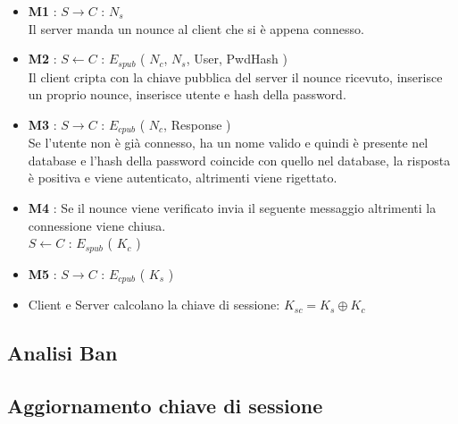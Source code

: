 \documentclass[a4paper,titlepage]{article}
\begin{document}
\begin{itemize}
\item \textbf{M1} : $S \rightarrow C$ : $N_s$ \\
Il server manda un nounce al client che si è appena connesso.
\item \textbf{M2} : $S \leftarrow C$ : $E_{spub}$ ( $N_c$, $N_s$, User, PwdHash )\\
Il client cripta con la chiave pubblica del server il nounce ricevuto, inserisce un proprio nounce, inserisce utente e hash della password.
\item \textbf{M3} : $S \rightarrow C$ : $E_{cpub}$ ( $N_c$, Response )\\
Se l'utente non è già connesso, ha un nome valido e quindi è presente nel database e l'hash della password coincide con quello nel database, la risposta è positiva e viene autenticato, altrimenti viene rigettato.
\item \textbf{M4} : Se il nounce viene verificato invia il seguente messaggio altrimenti la connessione viene chiusa.\\
$S \leftarrow C$ : $E_{spub}$ ( $K_c$ )
\item \textbf{M5} : $S \rightarrow C$ : $E_{cpub}$ ( $K_s$ )
\item Client e Server calcolano la chiave di sessione: $ K_{sc} = K_s \oplus K_c $
\end{itemize}

\subsection{Analisi Ban}


\subsection{Aggiornamento chiave di sessione}
\end{document}
